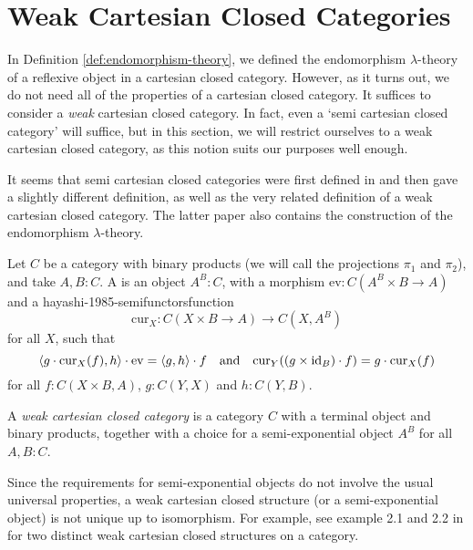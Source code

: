 \chapter{Weak Cartesian Closed Categories}\label{ch:weak-cartesian-closed-categories}
In Definition \ref{def:endomorphism-theory}, we defined the endomorphism $ \lambda $-theory of a reflexive object in a cartesian closed category. However, as it turns out, we do not need all of the properties of a cartesian closed category. It suffices to consider a \textit{weak} cartesian closed category. In fact, even a `semi cartesian closed category' will suffice, but in this section, we will restrict ourselves to a weak cartesian closed category, as this notion suits our purposes well enough.

It seems that semi cartesian closed categories were first defined in \cite{hayashi-1985-semifunctors} and then \cite{hoofman-1993-semi-cartesian-closed} gave a slightly different definition, as well as the very related definition of a weak cartesian closed category. The latter paper also contains the construction of the endomorphism $ \lambda $-theory.

\begin{definition}
  Let $ C $ be a category with binary products (we will call the projections $ \pi_1 $ and $ \pi_2 $), and take $ A, B : C $. A  is an object $ A^B : C $, with a morphism $ \mathrm{ev}: C(A^B \times B \to A) $ and a hayashi-1985-semifunctorsfunction
  \[ \mathrm{cur}_X: C(X \times B \to A) \to C(X, A^B) \]
  for all $ X $, such that
  \[ \langle g \cdot \mathrm{cur}_X(f), h \rangle \cdot \mathrm{ev} = \langle g, h \rangle \cdot f \quad \text{and} \quad \mathrm{cur}_Y((g \times \text{id}_{B}) \cdot f) = g \cdot \mathrm{cur}_X(f) \]
  for all $ f: C(X \times B, A) $, $ g : C(Y, X) $ and $ h : C(Y, B) $.
\end{definition}

\begin{definition}
  A \textit{weak cartesian closed category} is a category $ C $ with a terminal object and binary products, together with a choice for a semi-exponential object $ A^B $ for all $ A, B : C $.
\end{definition}

\begin{remark}
  Since the requirements for semi-exponential objects do not involve the usual universal properties, a weak cartesian closed structure (or a semi-exponential object) is not unique up to isomorphism. For example, see example 2.1 and 2.2 in \cite{hoofman-1993-semi-cartesian-closed} for two distinct weak cartesian closed structures on a category.
\end{remark}


